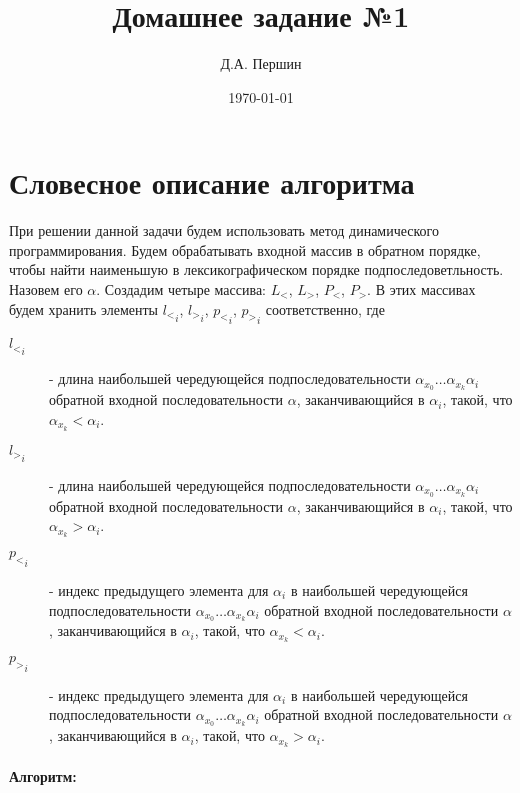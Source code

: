 \documentclass[12pt]{article}
\title{\bf Домашнее задание №1}
\author{Д.А. Першин}
\date{\today}
\begin{document}
\maketitle


\section{Словесное описание алгоритма}
При решении данной задачи будем использовать метод динамического программирования. Будем обрабатывать входной массив в обратном порядке, чтобы найти наименьшую в лексикографическом порядке подпоследоветльность. Назовем его $\alpha$.
Создадим четыре массива: $L_<$, $L_>$, $P_<$, $P_>$. В этих массивах будем хранить элементы ${l_<}_i$, ${l_>}_i$, ${p_<}_i$, ${p_>}_i$ соответственно, где

\begin{description}

\item[${l_<}_i$] - длина наибольшей чередующейся подпоследовательности $\alpha_{x_0}\dots \alpha_{x_k}\alpha_i$
обратной входной последовательности $\alpha$, заканчивающийся в $\alpha_i$, такой, что $\alpha_{x_k}<\alpha_i$.

\item[${l_>}_i$] - длина наибольшей чередующейся подпоследовательности $\alpha_{x_0}\dots \alpha_{x_k}\alpha_i$
обратной входной последовательности $\alpha$, заканчивающийся в $\alpha_i$, такой, что $\alpha_{x_k}>\alpha_i$.

\item[${p_<}_i$] - индекс предыдущего элемента для $\alpha_i$ в наибольшей чередующейся подпоследовательности
$\alpha_{x_0}\dots\alpha_{x_k}\alpha_i$ обратной входной последовательности $\alpha$,
заканчивающийся в $\alpha_i$, такой, что $\alpha_{x_k}<\alpha_i$.
\item[${p_>}_i$] - индекс предыдущего элемента для $\alpha_i$ в наибольшей чередующейся подпоследовательности
$\alpha_{x_0}\dots\alpha_{x_k}\alpha_i$ обратной входной последовательности $\alpha$,
заканчивающийся в $\alpha_i$, такой, что $\alpha_{x_k}>\alpha_i$.
\end{description}

\paragraph{Алгоритм:}
\end{document}
